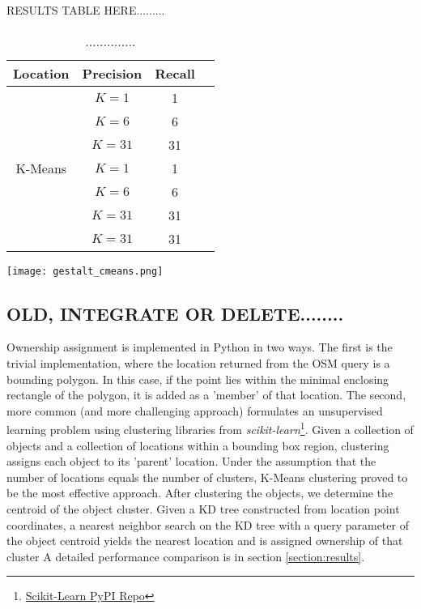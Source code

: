 RESULTS TABLE HERE.........
\begin{table}[h!]
	\begin{center}
		\begin{tabular}{ |c|c|c|c| } 
			\hline
			Location & Precision & Recall \\
			\hline
			\multirow{7}{4em}{K-Means} 
                & $K=1$ & 1 \\ 
			& $K=6$ & 6  \\ 
			& $K=31$ & 31 \\ 
                & $K=1$ & 1 \\ 
			& $K=6$ & 6  \\ 
			& $K=31$ & 31 \\ 
   			& $K=31$ & 31 \\ 
			\hline
		\end{tabular}
		\label{table:clustering}
		\caption{..............}
	\end{center}
\end{table}


\begin{figure*}[ht]
\label{fig:cmeans}        
\texttt{[image: gestalt\_cmeans.png]}
\centering
\caption[width=\textwidth]{............}
\end{figure*}



\subsection{OLD, INTEGRATE OR DELETE........}
Ownership assignment is implemented in Python in two ways. The first is the trivial implementation, where the location returned from the OSM query is a bounding polygon. 
In this case, if the point lies within the minimal enclosing rectangle of the polygon, it is added as a 'member' of that location. 
The second, more common (and more challenging approach) formulates an unsupervised learning problem using clustering libraries from \textit{scikit-learn}\footnote{\href{https://pypi.org/project/scikit-learn/}{Scikit-Learn PyPI Repo}}. 
Given a collection of objects and a collection of locations within a bounding box region, clustering assigns each object to its 'parent' location. 
Under the assumption that the number of locations equals the number of clusters, K-Means clustering proved to be the most effective approach. 
After clustering the objects, we determine the centroid of the object cluster. Given a KD tree constructed from location point coordinates, a nearest neighbor search on the KD tree with a query parameter of the object centroid yields the nearest location and is assigned ownership of that cluster
A detailed performance comparison is in section \ref{section:results}. 

